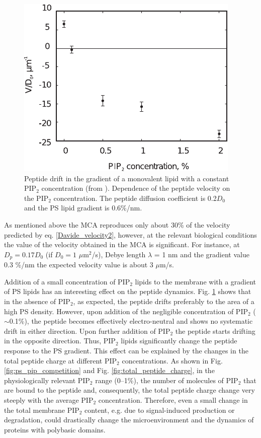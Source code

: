 \begin{figure}[!ht]
\begin{center}
  \includegraphics[scale=1.12]{../figures/gradient_MCA_results_pip.pdf}
\end{center}
 \caption[Peptide drift in the gradient of a monovalent lipid with a constant PIP$_2$ concentration]{Peptide drift in the gradient of a monovalent lipid with a constant PIP$_2$ concentration (from \cite{Kiselev2011}). Dependence of the peptide velocity on the PIP$_2$ concentration. The peptide diffusion coefficient is 0.2$D_0$ and the PS lipid gradient is 0.6\%/nm.}
\label{fig:gradient_MCA_results_pip}
\end{figure}

As mentioned above the MCA reproduces only about 30\% of the velocity predicted by eq. \eqref{Davide_velocity2}, however, at the relevant biological conditions the value of the velocity obtained in the MCA is significant. For instance, at $D_p=0.17D_0$ (if $D_0=1$ $\mu$m$^2$/s), Debye length $\lambda$ = 1 nm and the gradient value 0.3 \%/nm the expected velocity value is about 3 $\mu$m/s.

Addition of a small concentration of PIP$_2$ lipids to the membrane with a gradient of PS lipids has an interesting effect on the peptide dynamics. Fig. \ref{fig:gradient_MCA_results_pip} shows that in the absence of PIP$_2$, as expected, the peptide drifts preferably to the area of a high PS density. However, upon addition of the negligible concentration of PIP$_2$ ($\sim$0.1\%), the peptide becomes effectively electro-neutral and shows no systematic drift in either direction. Upon further addition of PIP$_2$ the peptide starts drifting in the opposite direction. Thus, PIP$_2$ lipids significantly change the peptide response to the PS gradient. This effect can be explained by the changes in the total peptide charge at different PIP$_2$ concentrations. As shown in Fig. \ref{fig:ps_pip_competition} and Fig. \ref{fig:total_peptide_charge}, in the physiologically relevant PIP$_2$ range (0--1\%), the number of molecules of PIP$_2$ that are bound to the peptide and, consequently, the total peptide charge change very steeply with the average PIP$_2$ concentration. Therefore, even a small change in the total membrane PIP$_2$ content, e.g. due to signal-induced production or degradation, could drastically change the microenvironment and the dynamics of proteins with polybasic domains.

